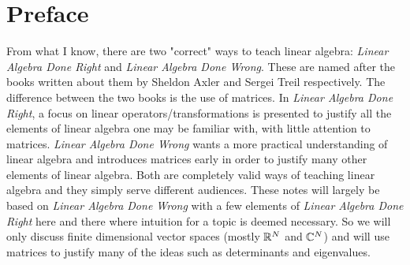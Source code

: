 \chapter{Preface}

From what I know, there are two "correct" ways to teach linear algebra: \textit{Linear Algebra Done Right} and \textit{Linear Algebra Done Wrong}. These are named after the books written about them by Sheldon Axler and Sergei Treil respectively. The difference between the two books is the use of matrices. In \textit{Linear Algebra Done Right}, a focus on linear operators/transformations is presented to justify all the elements of linear algebra one may be familiar with, with little attention to matrices. \textit{Linear Algebra Done Wrong} wants a more practical understanding of linear algebra and introduces matrices early in order to justify many other elements of linear algebra. Both are completely valid ways of teaching linear algebra and they simply serve different audiences. These notes will largely be based on \textit{Linear Algebra Done Wrong} with a few elements of \textit{Linear Algebra Done Right} here and there where intuition for a topic is deemed necessary. So we will only discuss finite dimensional vector spaces (mostly $\mathbb{R}^N$ and $\mathbb{C}^N$) and will use matrices to justify many of the ideas such as determinants and eigenvalues.